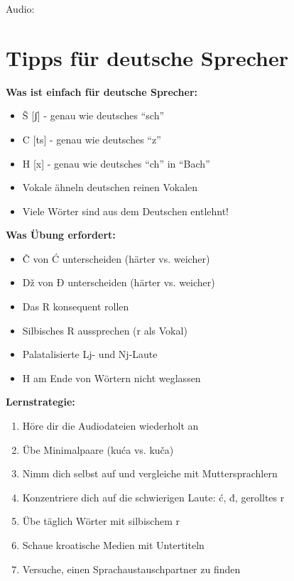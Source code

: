 Audio: 

\section{Tipps für deutsche Sprecher}

\begin{tcolorbox}[colback=lightblue!20, colframe=croatianblue, title=\textbf{Spezielle Tipps}]

\textbf{Was ist einfach für deutsche Sprecher:}
\begin{itemize}
    \item Š [ʃ] - genau wie deutsches ``sch''
    \item C [ts] - genau wie deutsches ``z''
    \item H [x] - genau wie deutsches ``ch'' in ``Bach''
    \item Vokale ähneln deutschen reinen Vokalen
    \item Viele Wörter sind aus dem Deutschen entlehnt!
\end{itemize}

\textbf{Was Übung erfordert:}
\begin{itemize}
    \item Č von Ć unterscheiden (härter vs. weicher)
    \item Dž von Đ unterscheiden (härter vs. weicher)
    \item Das R konsequent rollen
    \item Silbisches R aussprechen (r als Vokal)
    \item Palatalisierte Lj- und Nj-Laute
    \item H am Ende von Wörtern nicht weglassen
\end{itemize}

\textbf{Lernstrategie:}
\begin{enumerate}
    \item Höre dir die Audiodateien wiederholt an
    \item Übe Minimalpaare (kuća vs. kuča)
    \item Nimm dich selbst auf und vergleiche mit Muttersprachlern
    \item Konzentriere dich auf die schwierigen Laute: ć, đ, gerolltes r
    \item Übe täglich Wörter mit silbischem r
    \item Schaue kroatische Medien mit Untertiteln
    \item Versuche, einen Sprachaustauschpartner zu finden
\end{enumerate}

\end{tcolorbox}

